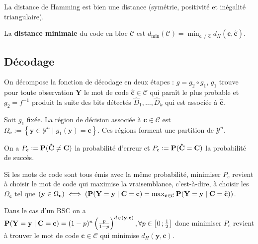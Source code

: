 	\begin{pop}
		La distance de Hamming est bien une distance (symétrie, positivité et inégalité triangulaire).
	\end{pop}

	\begin{defn}
		La \textbf{distance minimale} du code en bloc $\mathcal{C}$ est
		$d_{\min}(\mathcal{C}) =
			\min_{ \mathbf{c} \neq \mathbf{\hat{c}} }
			d_H(\mathbf{c},\mathbf{\hat{c}})$.
	\end{defn}


\subsection{Décodage}

	On décompose la fonction de décodage en deux étapes : $g = g_2 \circ g_1$, $g_1$ trouve pour toute observation $\mathbf{Y}$ le mot de code $\mathbf{\hat{c}} \in \mathcal{C}$ qui paraît le plus probable et $g_2 = f^{-1}$ produit la suite des bits détectés $\hat{D}_1,\ldots,\hat{D}_k$ qui est associée à $\mathbf{\hat{c}}$.

	\begin{defn}
		Soit $g_1$ fixée. La région de décision associée à $\mathbf{c} \in \mathcal{C}$ est $\Omega_{\mathbf{c}} := \left\{ \mathbf{y} \in \mathcal{Y}^n \mid g_1(\mathbf{y}) = \mathbf{c} \right\}$.
		Ces régions forment une partition de $\mathcal{Y}^n$.
	\end{defn}

	On a $P_e := \mathbf{P}(\mathbf{\hat{C}} \neq \mathbf{C})$ la probabilité d'erreur et $P_c := \mathbf{P}(\mathbf{\hat{C}} = \mathbf{C})$ la probabilité de succès.

	\begin{pop}
		Si les mots de code sont tous émis avec la même probabilité, minimiser $P_e$ revient à choisir le mot de code qui maximise la vraisemblance, c'est-à-dire, à choisir les $\Omega_{\mathbf{c}}$ tel que
		$\left( \mathbf{y} \in \Omega_{\mathbf{c}} \right)
			\iff
		\left(
			\mathbf{P}(\mathbf{Y} = \mathbf{y} \mid \mathbf{C} = \mathbf{c})
			= \max_{\mathbf{\tilde{c}} \in \mathcal{C}} \mathbf{P}(\mathbf{Y} = \mathbf{y} \mid \mathbf{C} = \mathbf{\tilde{c}})
		\right)$.
	\end{pop}

	\begin{pop}
		Dans le cas d'un BSC on a
		$\mathbf{P}(\mathbf{Y} = \mathbf{y} \mid \mathbf{C} = \mathbf{c}) = (1 - p)^n \left( \frac{p}{1 - p} \right)^{d_H(\mathbf{y},\mathbf{c})},
			\forall p \in \mathopen{}\mathclose{\left[0\mathclose{}\mathpunct{};\frac{1}{2}\right]}$
		donc minimiser $P_e$ revient à trouver le mot de code $\mathbf{c} \in \mathcal{C}$ qui minimise $d_H(\mathbf{y},\mathbf{c})$.
	\end{pop}


